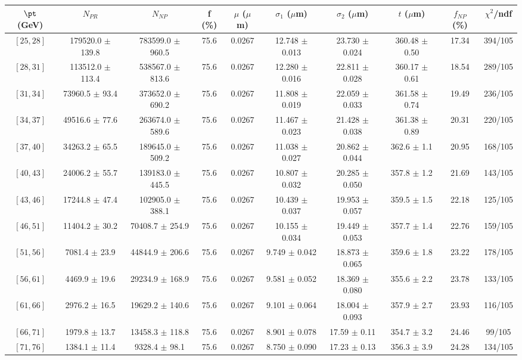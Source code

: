 \begin{tabular}{c||c|c|c|c|c|c|c||c|c}
$\pt$ (GeV) & $N_{PR}$ & $N_{NP}$ & f (\%) & $\mu$ ($\mu$m) & $\sigma_1$ ($\mu$m) & $\sigma_2$ ($\mu$m)  & $t$ ($\mu$m) & $f_{NP}$ (\%) & $\chi^2$/ndf \\
\hline
$[25, 28]$ & 179520.0 $\pm$ 139.8 & 783599.0 $\pm$ 960.5 & 75.6 & 0.0267 & 12.748 $\pm$ 0.013 & 23.730 $\pm$ 0.024 & 360.48 $\pm$ 0.50 & 17.34 & 394/105\\
$[28, 31]$ & 113512.0 $\pm$ 113.4 & 538567.0 $\pm$ 813.6 & 75.6 & 0.0267 & 12.280 $\pm$ 0.016 & 22.811 $\pm$ 0.028 & 360.17 $\pm$ 0.61 & 18.54 & 289/105\\
$[31, 34]$ & 73960.5 $\pm$ 93.4 & 373652.0 $\pm$ 690.2 & 75.6 & 0.0267 & 11.808 $\pm$ 0.019 & 22.059 $\pm$ 0.033 & 361.58 $\pm$ 0.74 & 19.49 & 236/105\\
$[34, 37]$ & 49516.6 $\pm$ 77.6 & 263674.0 $\pm$ 589.6 & 75.6 & 0.0267 & 11.467 $\pm$ 0.023 & 21.428 $\pm$ 0.038 & 361.38 $\pm$ 0.89 & 20.31 & 220/105\\
$[37, 40]$ & 34263.2 $\pm$ 65.5 & 189645.0 $\pm$ 509.2 & 75.6 & 0.0267 & 11.038 $\pm$ 0.027 & 20.862 $\pm$ 0.044 & 362.6 $\pm$ 1.1 & 20.95 & 168/105\\
$[40, 43]$ & 24006.2 $\pm$ 55.7 & 139183.0 $\pm$ 445.5 & 75.6 & 0.0267 & 10.807 $\pm$ 0.032 & 20.285 $\pm$ 0.050 & 357.8 $\pm$ 1.2 & 21.69 & 143/105\\
$[43, 46]$ & 17244.8 $\pm$ 47.4 & 102905.0 $\pm$ 388.1 & 75.6 & 0.0267 & 10.439 $\pm$ 0.037 & 19.953 $\pm$ 0.057 & 359.5 $\pm$ 1.5 & 22.18 & 125/105\\
$[46, 51]$ & 11404.2 $\pm$ 30.2 & 70408.7 $\pm$ 254.9 & 75.6 & 0.0267 & 10.155 $\pm$ 0.034 & 19.449 $\pm$ 0.053 & 357.7 $\pm$ 1.4 & 22.76 & 159/105\\
$[51, 56]$ & 7081.4 $\pm$ 23.9 & 44844.9 $\pm$ 206.6 & 75.6 & 0.0267 & 9.749 $\pm$ 0.042 & 18.873 $\pm$ 0.065 & 359.6 $\pm$ 1.8 & 23.22 & 178/105\\
$[56, 61]$ & 4469.9 $\pm$ 19.6 & 29234.9 $\pm$ 168.9 & 75.6 & 0.0267 & 9.581 $\pm$ 0.052 & 18.369 $\pm$ 0.080 & 355.6 $\pm$ 2.2 & 23.78 & 133/105\\
$[61, 66]$ & 2976.2 $\pm$ 16.5 & 19629.2 $\pm$ 140.6 & 75.6 & 0.0267 & 9.101 $\pm$ 0.064 & 18.004 $\pm$ 0.093 & 357.9 $\pm$ 2.7 & 23.93 & 116/105\\
$[66, 71]$ & 1979.8 $\pm$ 13.7 & 13458.3 $\pm$ 118.8 & 75.6 & 0.0267 & 8.901 $\pm$ 0.078 & 17.59 $\pm$ 0.11 & 354.7 $\pm$ 3.2 & 24.46 & 99/105\\
$[71, 76]$ & 1384.1 $\pm$ 11.4 & 9328.4 $\pm$ 98.1 & 75.6 & 0.0267 & 8.750 $\pm$ 0.090 & 17.23 $\pm$ 0.13 & 356.3 $\pm$ 3.9 & 24.28 & 134/105\\

\end{tabular}

